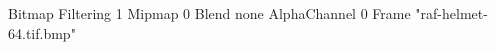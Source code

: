 {Bitmap
	{Filtering 1}
	{Mipmap 0}
	{Blend none}
	{AlphaChannel 0}
	{Frame "raf-helmet-64.tif.bmp"}
}
